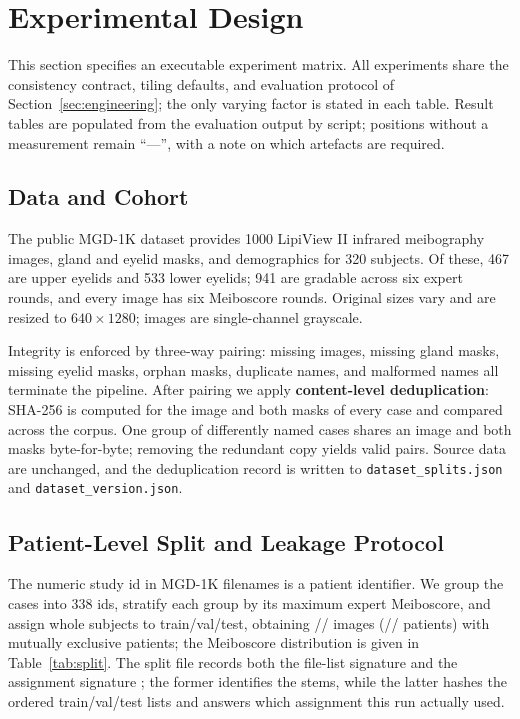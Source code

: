 \section{Experimental Design}\label{sec:experiments}

This section specifies an executable experiment matrix. All experiments share the consistency contract, tiling defaults, and evaluation protocol of Section~\ref{sec:engineering}; the only varying factor is stated in each table. Result tables are populated from the evaluation output by script; positions without a measurement remain ``---'', with a note on which artefacts are required.

\subsection{Data and Cohort}

The public MGD-1K dataset provides 1000 LipiView II infrared meibography images, gland and eyelid masks, and demographics for 320 subjects\cite{saha2022automated}. Of these, 467 are upper eyelids and 533 lower eyelids; 941 are gradable across six expert rounds, and every image has six Meiboscore rounds. Original sizes vary and are resized to $640\times1280$; images are single-channel grayscale.

Integrity is enforced by three-way pairing: missing images, missing gland masks, missing eyelid masks, orphan masks, duplicate names, and malformed names all terminate the pipeline. After pairing we apply \textbf{content-level deduplication}: SHA-256 is computed for the image and both masks of every case and compared across the corpus. One group of differently named cases shares an image and both masks byte-for-byte; removing the redundant copy yields \nTotal{} valid pairs. Source data are unchanged, and the deduplication record is written to \texttt{dataset\_splits.json} and \texttt{dataset\_version.json}.

\subsection{Patient-Level Split and Leakage Protocol}\label{sec:split-design}

The numeric study id in MGD-1K filenames is a patient identifier. We group the \nTotal{} cases into 338 ids, stratify each group by its maximum expert Meiboscore, and assign whole subjects to train/val/test, obtaining \nTrain/\nVal/\nTest{} images (\nTrainPatients/\nValPatients/\nTestPatients{} patients) with mutually exclusive patients; the Meiboscore distribution is given in Table~\ref{tab:split}. The split file records both the file-list signature \splitSig{} and the assignment signature \assignmentSig{}; the former identifies the \nTotal{} stems, while the latter hashes the ordered train/val/test lists and answers which assignment this run actually used.

